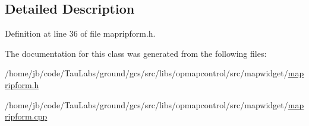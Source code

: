 \subsection{\-Detailed \-Description}


\-Definition at line 36 of file mapripform.\-h.



\-The documentation for this class was generated from the following files\-:\begin{DoxyCompactItemize}
\item 
/home/jb/code/\-Tau\-Labs/ground/gcs/src/libs/opmapcontrol/src/mapwidget/\hyperlink{mapripform_8h}{mapripform.\-h}\item 
/home/jb/code/\-Tau\-Labs/ground/gcs/src/libs/opmapcontrol/src/mapwidget/\hyperlink{mapripform_8cpp}{mapripform.\-cpp}\end{DoxyCompactItemize}
